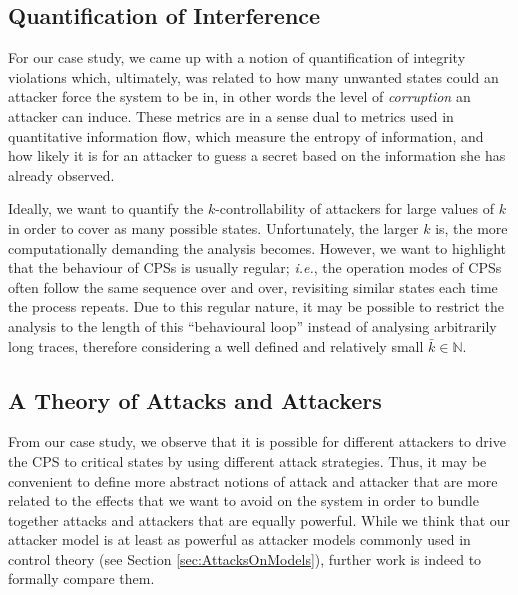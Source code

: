 {{\subsection{Quantification of Interference}
For our case study, we came up with a notion of quantification of integrity violations which, ultimately, was related to how many unwanted states could an attacker force the system to be in, in other words the level of \emph{corruption} an attacker can induce. These metrics are in a sense dual to metrics used in quantitative information flow, which measure the entropy of information, and how likely it is for an attacker to guess a secret based on the information she has already observed. 

Ideally, we want to quantify the $k$-controllability of attackers for large values of $k$ in order to cover as many possible states. Unfortunately, the larger $k$ is, the more computationally demanding the analysis becomes. However, we want to highlight that the behaviour of CPSs is usually regular; \emph{i.e.}, the operation modes of CPSs often follow the same sequence over and over, revisiting similar states each time the process repeats. Due to this regular nature, it may be possible to restrict the analysis to the length of this ``behavioural loop'' instead of analysing arbitrarily long traces, therefore considering a well defined and relatively small $\bar{k} \in \mathbb{N}$.

\subsection{A Theory of Attacks and Attackers}
From our case study, we observe that it is possible for different attackers to drive the CPS to critical states by using different attack strategies. Thus, it may be convenient to define more abstract notions of attack and attacker that are more related to the effects that we want to avoid on the system in order to bundle together attacks and attackers that are equally powerful.
While we think that our attacker model is at least as powerful as attacker models commonly used in control theory (see Section \ref{sec:AttacksOnModels}), further work is indeed to formally compare them. 

}}
